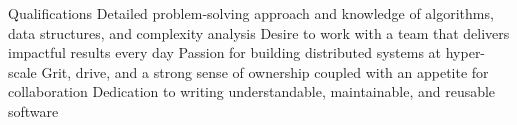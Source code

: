 \textcolor{Cream}{\fontsize{0.1pt}{0.1pt}\selectfont%
%
Qualifications
%
Detailed problem-solving approach and knowledge of algorithms, data structures, and complexity analysis
Desire to work with a team that delivers impactful results every day
Passion for building distributed systems at hyper-scale
Grit, drive, and a strong sense of ownership coupled with an appetite for collaboration
Dedication to writing understandable, maintainable, and reusable software
}
% 

